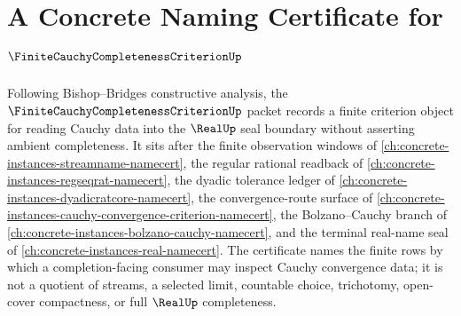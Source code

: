 \chapter{A Concrete Naming Certificate for $\FiniteCauchyCompletenessCriterionUp$}
\label{ch:concrete-instances-finite-cauchy-completeness-criterion-namecert}

Following Bishop--Bridges constructive analysis, the $\FiniteCauchyCompletenessCriterionUp$ packet records a finite criterion object for reading Cauchy data into the $\RealUp$ seal boundary without asserting ambient completeness. It sits after the finite observation windows of \autoref{ch:concrete-instances-streamname-namecert}, the regular rational readback of \autoref{ch:concrete-instances-regseqrat-namecert}, the dyadic tolerance ledger of \autoref{ch:concrete-instances-dyadicratcore-namecert}, the convergence-route surface of \autoref{ch:concrete-instances-cauchy-convergence-criterion-namecert}, the Bolzano--Cauchy branch of \autoref{ch:concrete-instances-bolzano-cauchy-namecert}, and the terminal real-name seal of \autoref{ch:concrete-instances-real-namecert}. The certificate names the finite rows by which a completion-facing consumer may inspect Cauchy convergence data; it is not a quotient of streams, a selected limit, countable choice, trichotomy, open-cover compactness, or full $\RealUp$ completeness.

